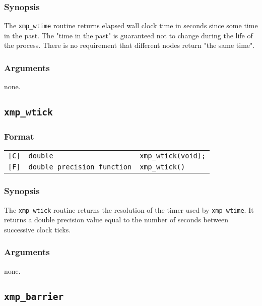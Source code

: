 \subsubsection*{Synopsis}
    The {\tt xmp\_wtime} routine returns elapsed wall clock time in seconds 
    since some time in the past. The "time in the past" is guaranteed not to change
    during the life of the process.
    There is no requirement that different nodes return "the same time".

\subsubsection*{Arguments}
    none.


\vspace{0.3cm}

\subsection{\tt xmp\_wtick}

\subsubsection*{Format}

\begin{tabular}{lll}

\verb![C]!&  {\tt double}& {\tt xmp\_wtick(void);}\\

\verb![F]!&  {\tt double precision function}& {\tt xmp\_wtick()}

\end{tabular}

\subsubsection*{Synopsis}
    The {\tt xmp\_wtick} routine returns the resolution of the timer used by {\tt xmp\_wtime}.
    It returns a double precision value equal to the number of seconds 
    between successive clock ticks.

\subsubsection*{Arguments}
    none.


\vspace{0.3cm}

\subsection{\tt xmp\_barrier}

